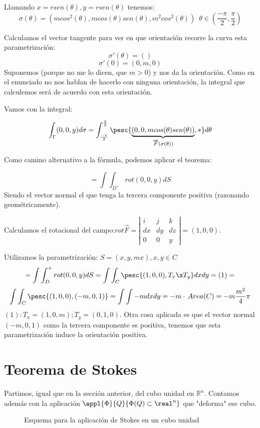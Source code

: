 Llamando $x=rsen(\theta),y=rsen(\theta)$ tenemos:
\[\sigma(\theta) = \left(mcos^2(\theta),mcos(\theta)sen(\theta),m^2cos^2(\theta)\right)\,\,\,\theta\in\left(\frac{-\pi}{2},\frac{\pi}{2}\right)\]

Calculamos el vector tangente para ver en que orientación recorre la curva esta parametrización:
\[\sigma'(\theta) = ()\]
\[\sigma'(0) = (0,m,0)\]
Suponemos (porque no me lo dicen, que $m>0$) y nos da la orientación. Como en el enunciado no nos hablan de hacerlo con ninguna orientación, la integral que calculemos será de acuerdo con esta orientación.

Vamos con la integral:

\[\int_{\Gamma}(0,0,y) d\sigma =\int_{\frac{-\pi}{2}}^{\frac{\pi}{2}}\pesc{\underbrace{\left(0,0,mcos(\theta)sen(\theta)\right)}_{\overrightarrow{F}(\sigma(\theta))},\ast} d\theta\]

Como camino alternativo a la fórmula, podemos aplicar el teorema:

\[ = \int\int_{D^+}  rot(0,0,y)dS\] Siendo el vector normal el que tenga la tercera componente positiva (razonando geométricamente).

Calculamos el rotacional del campo:$rot\overrightarrow{F} =\left|\begin{matrix}
i&j&k\\dx&dy&dz\\0&0&y
\end{matrix}\right| = (1,0,0)$.

Utilizamos la parametrización: $S = (x,y,mx), x,y\in C$
\[ = \int\int_D^+ rot(0,0,y)dS = \int \int_C \pesc{(1,0,0) ,T_x\x T_y} dxdy= (1) =\]
\[ \int \int_C \pesc{(1,0,0),(-m,0,1)} = \int\int -m dxdy = -m \cdot \, Area (C) = -m\frac{m^2}{4}\pi \]
$(1): T_x = (1,0,m); T_y = (0,1,0) $. Otra cosa aplicada es que el vector normal $(-m,0,1)$ como la tercera componente es positiva, tenemos que esta parametrización induce la orientación positiva.


\section{Teorema de Stokes}

Partimos, igual que en la sección anterior, del cubo unidad en $ℝ^n$. Contamos además con la aplicación $\appl{\Phi}{Q}{\Phi(Q)\subset\real^n}$ que "deforma" ese cubo.

\begin{figure}[hbtp]
\centering

\caption{Esquema para la aplicación de Stokes en un cubo unidad}
\end{figure}

